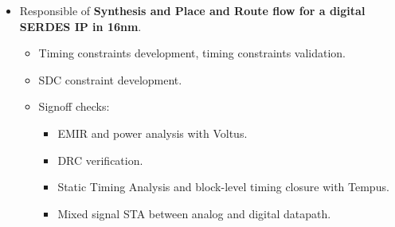 \begin{cventries}
{\begin{cvitems}
        \begin{itemize}
          \item {Responsible of \textbf{Synthesis and Place and Route flow for a digital SERDES IP in 16nm}.}
          \begin{itemize}
            \item {Timing constraints development, timing constraints validation.}
            \item {SDC constraint development.}
            \item {Signoff checks:}
            \begin{itemize}
              \item {EMIR and power analysis with Voltus.}
              \item {DRC verification.}
              \item {Static Timing Analysis and block-level timing closure with Tempus.}
              \item {Mixed signal STA between analog and digital datapath.}
            \end{itemize}
          \end{itemize}
        \end{itemize}
      \end{cvitems}
    }



\end{cventries}

